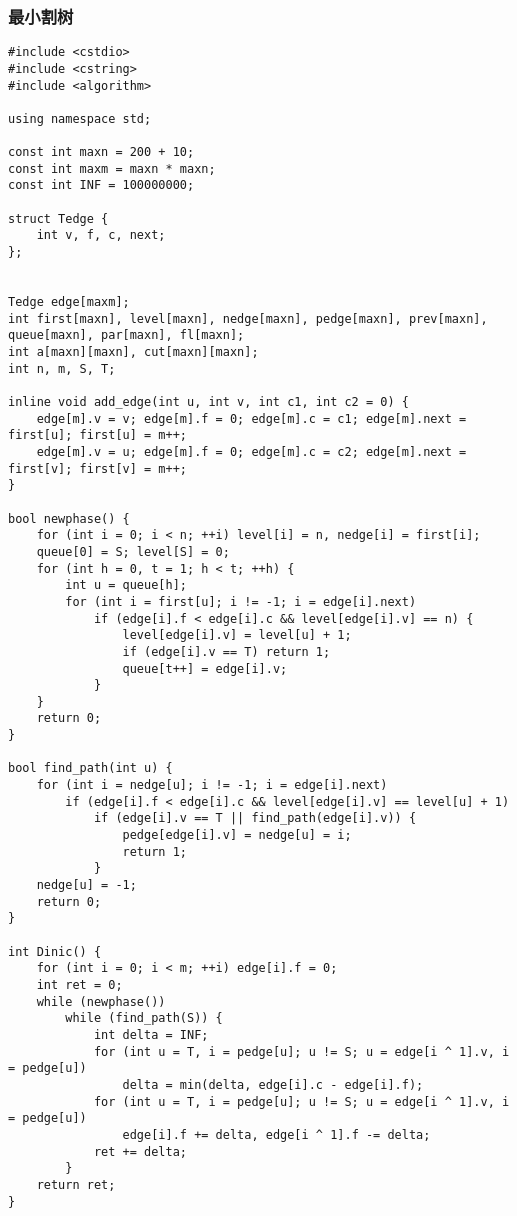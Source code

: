 \subsubsection{最小割树}
\begin{verbatim}
#include <cstdio>
#include <cstring>
#include <algorithm>

using namespace std;

const int maxn = 200 + 10;
const int maxm = maxn * maxn;
const int INF = 100000000;

struct Tedge {
    int v, f, c, next;
};


Tedge edge[maxm];
int first[maxn], level[maxn], nedge[maxn], pedge[maxn], prev[maxn], queue[maxn], par[maxn], fl[maxn];
int a[maxn][maxn], cut[maxn][maxn];
int n, m, S, T;

inline void add_edge(int u, int v, int c1, int c2 = 0) {
    edge[m].v = v; edge[m].f = 0; edge[m].c = c1; edge[m].next = first[u]; first[u] = m++;
    edge[m].v = u; edge[m].f = 0; edge[m].c = c2; edge[m].next = first[v]; first[v] = m++;
}

bool newphase() {
    for (int i = 0; i < n; ++i) level[i] = n, nedge[i] = first[i];
    queue[0] = S; level[S] = 0;
    for (int h = 0, t = 1; h < t; ++h) {
        int u = queue[h];
        for (int i = first[u]; i != -1; i = edge[i].next)
            if (edge[i].f < edge[i].c && level[edge[i].v] == n) {
                level[edge[i].v] = level[u] + 1;
                if (edge[i].v == T) return 1;
                queue[t++] = edge[i].v;
            }
    }
    return 0;
}

bool find_path(int u) {
    for (int i = nedge[u]; i != -1; i = edge[i].next)
        if (edge[i].f < edge[i].c && level[edge[i].v] == level[u] + 1)
            if (edge[i].v == T || find_path(edge[i].v)) {
                pedge[edge[i].v] = nedge[u] = i;
                return 1;
            }
    nedge[u] = -1;
    return 0;
}

int Dinic() {
    for (int i = 0; i < m; ++i) edge[i].f = 0;
    int ret = 0;
    while (newphase())
        while (find_path(S)) {
            int delta = INF;
            for (int u = T, i = pedge[u]; u != S; u = edge[i ^ 1].v, i = pedge[u])
                delta = min(delta, edge[i].c - edge[i].f);
            for (int u = T, i = pedge[u]; u != S; u = edge[i ^ 1].v, i = pedge[u])
                edge[i].f += delta, edge[i ^ 1].f -= delta;
            ret += delta;
        }
    return ret;
}


\end{verbatim}
